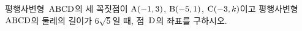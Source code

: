 평행사변형~$\mathrm{ABCD}$의 세 꼭짓점이 $\mathrm{A}(-1{,}\mkern3mu\mathopen{}3)$, $\mathrm{B}(-5{,}\mkern3mu\mathopen{}1)$, $\mathrm{C}(-3{,}\mkern3mu\mathopen{}k)$이고 평행사변형~$\mathrm{ABCD}$의 둘레의 길이가 $6\sqrt{5}$일 때, 점~$\mathrm{D}$의 좌표를 구하시오.
